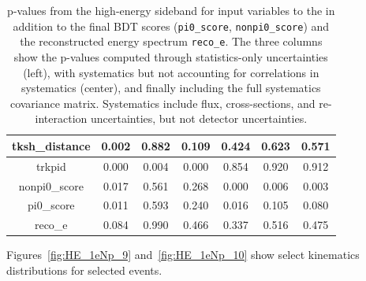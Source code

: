 \begin{table}[H]
\begin{tabular}{| c | c | c | c | c | c | c | }
tksh\_distance & 0.002 & 0.882 & 0.109 & 0.424 & 0.623 & 0.571 \\ \hline
trkpid & 0.000 & 0.004 & 0.000 & 0.854 & 0.920 & 0.912 \\ \hline
nonpi0\_score & 0.017 & 0.561 & 0.268 & 0.000 & 0.006 & 0.003 \\ \hline
pi0\_score & 0.011 & 0.593 & 0.240 & 0.016 & 0.105 & 0.080 \\ \hline
reco\_e & 0.084 & 0.990 & 0.466 & 0.337 & 0.516 & 0.475 \\ \hline
 \end{tabular}
 \caption{\label{tab:HiENPpvalues}p-values from the high-energy \npsel sideband for input variables to the \npsel in addition to the final BDT scores (\texttt{pi0\_score}, \texttt{nonpi0\_score}) and the reconstructed energy spectrum \texttt{reco\_e}. The three columns show the p-values computed through statistics-only uncertainties (left), with systematics but not accounting for correlations in systematics (center), and finally including the full systematics covariance matrix. Systematics include flux, cross-sections, and re-interaction uncertainties, but not detector uncertainties.}
\end{table}

Figures~\ref{fig:HE_1eNp_9} and~\ref{fig:HE_1eNp_10} show select kinematics distributions for selected \npsel events.

